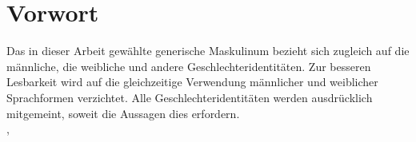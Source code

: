 \section*{Vorwort}

Das in dieser Arbeit gewählte generische Maskulinum bezieht sich zugleich auf die männliche, die weibliche und andere Geschlechteridentitäten. Zur besseren Lesbarkeit wird auf die gleichzeitige Verwendung männlicher und weiblicher Sprachformen verzichtet. Alle Geschlechteridentitäten werden ausdrücklich mitgemeint, soweit die Aussagen dies erfordern.
\\[1cm]
{\myOrt}, \myAbgabeDatum{}

{\myAutor}
